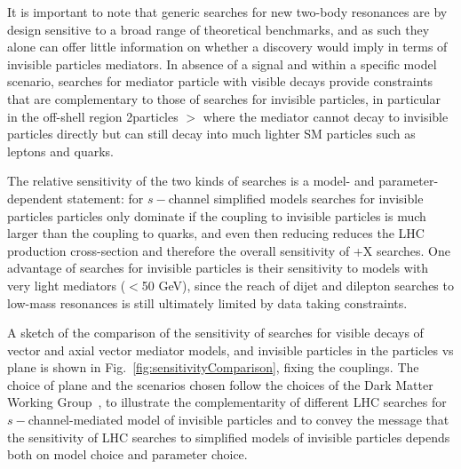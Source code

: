 It is important to note that generic searches for new two-body resonances
are by design sensitive to a broad range of theoretical benchmarks, 
and as such they alone can offer little information on 
whether a discovery would imply in terms of invisible particles mediators.
In absence of a signal and within a specific model scenario,
searches for mediator particle with visible decays
provide constraints that are complementary to those of searches
for invisible particles, in particular in the off-shell region 2\minvisible particles $>$ \mmed where the mediator
cannot decay to invisible particles directly but can still decay into much lighter SM particles
such as leptons and quarks. 

The relative sensitivity of the two kinds of searches
is a model- and parameter-dependent statement: for $s-$channel simplified models
searches for invisible particles particles only dominate if the coupling to invisible particles is much larger
than the coupling to quarks, and even then reducing \gq reduces the LHC production
cross-section and therefore the overall sensitivity of \MET+X searches. 
One advantage of searches for invisible particles is their sensitivity to models with
very light mediators ($<$50 GeV), since the reach of dijet and dilepton searches to low-mass
resonances is still ultimately limited by data taking constraints. 

A sketch of the comparison of the sensitivity of searches for visible decays of vector and axial vector mediator models, and invisible particles 
in the \minvisible particles vs \mmed plane is shown in Fig.~\ref{fig:sensitivityComparison}, fixing the couplings. The choice of plane and the scenarios chosen follow the choices of the Dark Matter Working Group~\cite{Albert:2017onk}, to illustrate the complementarity of different LHC searches for $s-$channel-mediated model of invisible particles and to convey the message that the sensitivity of LHC searches to simplified models of invisible particles depends both on model choice and parameter choice. 

